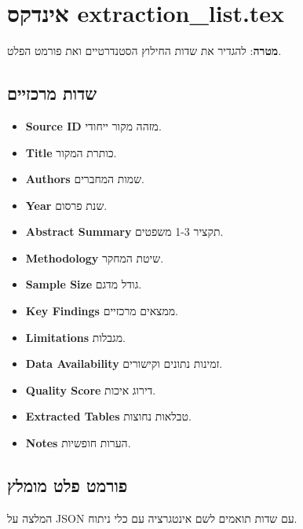 \documentclass[12pt]{article}
\begin{document}
\section*{אינדקס extraction\_list.tex}
\textbf{מטרה}:
להגדיר את שדות החילוץ הסטנדרטיים ואת פורמט הפלט.

\subsection*{שדות מרכזיים}
\begin{itemize}
  \item \textbf{Source ID} מזהה מקור ייחודי.
  \item \textbf{Title} כותרת המקור.
  \item \textbf{Authors} שמות המחברים.
  \item \textbf{Year} שנת פרסום.
  \item \textbf{Abstract Summary} תקציר 1-3 משפטים.
  \item \textbf{Methodology} שיטת המחקר.
  \item \textbf{Sample Size} גודל מדגם.
  \item \textbf{Key Findings} ממצאים מרכזיים.
  \item \textbf{Limitations} מגבלות.
  \item \textbf{Data Availability} זמינות נתונים וקישורים.
  \item \textbf{Quality Score} דירוג איכות.
  \item \textbf{Extracted Tables} טבלאות נחוצות.
  \item \textbf{Notes} הערות חופשיות.
\end{itemize}

\subsection*{פורמט פלט מומלץ}
המלצה על JSON עם שדות תואמים לשם אינטגרציה עם כלי ניתוח.
\end{document}
